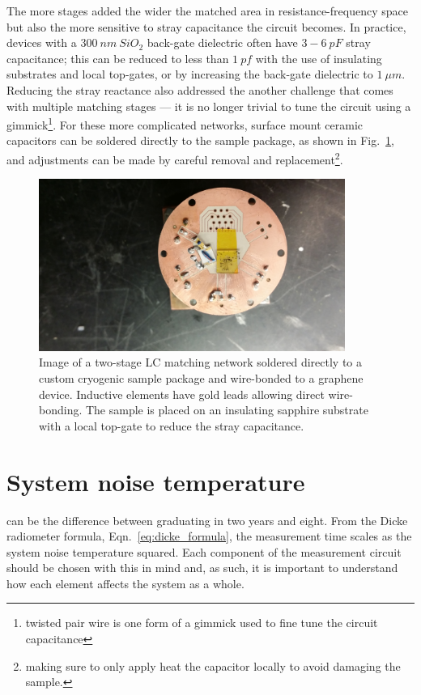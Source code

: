 The more stages added the wider the matched area in resistance-frequency space but also the more sensitive to stray capacitance the circuit becomes. In practice, devices with a $300~nm~SiO_2$ back-gate dielectric often have $3-6~pF$ stray capacitance; this can be reduced to less than $1~pf$ with the use of insulating substrates and local top-gates, or by increasing the back-gate dielectric to $1~\mu m$. Reducing the stray reactance also addressed the another challenge that comes with multiple matching stages --- it is no longer trivial to tune the circuit using a gimmick\footnote{twisted pair wire is one form of a gimmick used to fine tune the circuit capacitance}. For these more complicated networks, surface mount ceramic capacitors can be soldered directly to the sample package, as shown in Fig.~\ref{fig:picture_doubleLC}, and adjustments can be made by careful removal and replacement\footnote{making sure to only apply heat the capacitor locally to avoid damaging the sample.}.
\begin{figure}
\centering
\includegraphics[width = 100mm]{figures/Johnson_noise_thermometry/picture_matching_ceramic}
\caption{Image of a two-stage LC matching network soldered directly to a custom cryogenic sample package and wire-bonded to a graphene device. Inductive elements have gold leads allowing direct wire-bonding. The sample is placed on an insulating sapphire substrate with a local top-gate to reduce the stray capacitance.}
\label{fig:picture_doubleLC}
\end{figure}

\section{System noise temperature}
\label{section:system_noise_temperature}
 can be the difference between graduating in two years and eight. From the Dicke radiometer formula, Eqn.~\ref{eq:dicke_formula}, the measurement time scales as the system noise temperature squared. Each component of the measurement circuit should be chosen with this in mind and, as such, it is important to understand how each element affects the system as a whole.

